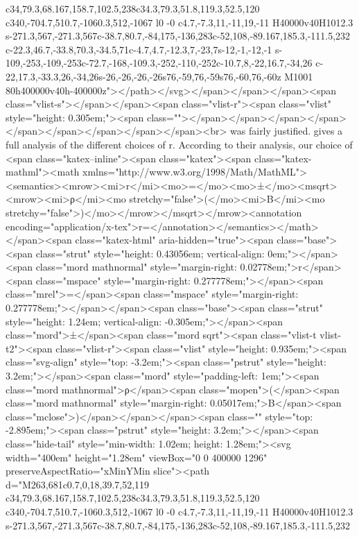 c34,79.3,68.167,158.7,102.5,238c34.3,79.3,51.8,119.3,52.5,120
c340,-704.7,510.7,-1060.3,512,-1067
l0 -0
c4.7,-7.3,11,-11,19,-11
H40000v40H1012.3
s-271.3,567,-271.3,567c-38.7,80.7,-84,175,-136,283c-52,108,-89.167,185.3,-111.5,232
c-22.3,46.7,-33.8,70.3,-34.5,71c-4.7,4.7,-12.3,7,-23,7s-12,-1,-12,-1
s-109,-253,-109,-253c-72.7,-168,-109.3,-252,-110,-252c-10.7,8,-22,16.7,-34,26
c-22,17.3,-33.3,26,-34,26s-26,-26,-26,-26s76,-59,76,-59s76,-60,76,-60z
M1001 80h400000v40h-400000z"></path></svg></span></span></span><span class="vlist-s">​</span></span><span class="vlist-r"><span class="vlist" style="height: 0.305em;"><span class=""></span></span></span></span></span></span></span></span></span><br>
was fairly justified. \cite{le2015estimating} gives a full analysis of the different choices of r. According to their analysis, our choice of <span class="katex--inline"><span class="katex"><span class="katex-mathml"><math xmlns="http://www.w3.org/1998/Math/MathML"><semantics><mrow><mi>r</mi><mo>=</mo><mo>±</mo><msqrt><mrow><mi>ρ</mi><mo stretchy="false">(</mo><mi>B</mi><mo stretchy="false">)</mo></mrow></msqrt></mrow><annotation encoding="application/x-tex">r=\pm{}</annotation></semantics></math></span><span class="katex-html" aria-hidden="true"><span class="base"><span class="strut" style="height: 0.43056em; vertical-align: 0em;"></span><span class="mord mathnormal" style="margin-right: 0.02778em;">r</span><span class="mspace" style="margin-right: 0.277778em;"></span><span class="mrel">=</span><span class="mspace" style="margin-right: 0.277778em;"></span></span><span class="base"><span class="strut" style="height: 1.24em; vertical-align: -0.305em;"></span><span class="mord">±</span><span class="mord sqrt"><span class="vlist-t vlist-t2"><span class="vlist-r"><span class="vlist" style="height: 0.935em;"><span class="svg-align" style="top: -3.2em;"><span class="pstrut" style="height: 3.2em;"></span><span class="mord" style="padding-left: 1em;"><span class="mord mathnormal">ρ</span><span class="mopen">(</span><span class="mord mathnormal" style="margin-right: 0.05017em;">B</span><span class="mclose">)</span></span></span><span class="" style="top: -2.895em;"><span class="pstrut" style="height: 3.2em;"></span><span class="hide-tail" style="min-width: 1.02em; height: 1.28em;"><svg width="400em" height="1.28em" viewBox="0 0 400000 1296" preserveAspectRatio="xMinYMin slice"><path d="M263,681c0.7,0,18,39.7,52,119
c34,79.3,68.167,158.7,102.5,238c34.3,79.3,51.8,119.3,52.5,120
c340,-704.7,510.7,-1060.3,512,-1067
l0 -0
c4.7,-7.3,11,-11,19,-11
H40000v40H1012.3
s-271.3,567,-271.3,567c-38.7,80.7,-84,175,-136,283c-52,108,-89.167,185.3,-111.5,232
